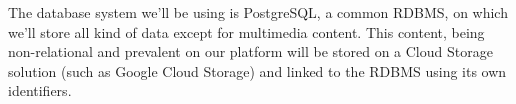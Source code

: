 The database system we'll be using is PostgreSQL, a common RDBMS, on which we'll store all kind of data except for multimedia content. This content,
being non-relational and prevalent on our platform will be stored on a Cloud Storage solution (such as Google Cloud Storage) and linked to the RDBMS
using its own identifiers.
